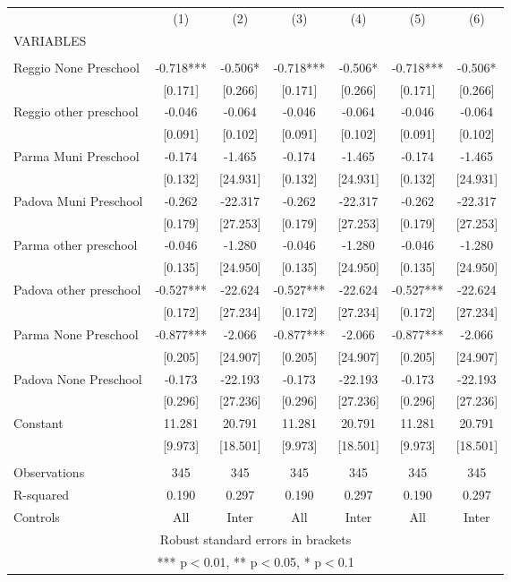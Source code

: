 \begin{tabular}{lcccccc} \hline
 & (1) & (2) & (3) & (4) & (5) & (6) \\
VARIABLES &  &  &  &  &  &  \\ \hline
 &  &  &  &  &  &  \\
Reggio None Preschool & -0.718*** & -0.506* & -0.718*** & -0.506* & -0.718*** & -0.506* \\
 & [0.171] & [0.266] & [0.171] & [0.266] & [0.171] & [0.266] \\
Reggio other preschool & -0.046 & -0.064 & -0.046 & -0.064 & -0.046 & -0.064 \\
 & [0.091] & [0.102] & [0.091] & [0.102] & [0.091] & [0.102] \\
Parma Muni Preschool & -0.174 & -1.465 & -0.174 & -1.465 & -0.174 & -1.465 \\
 & [0.132] & [24.931] & [0.132] & [24.931] & [0.132] & [24.931] \\
Padova Muni Preschool & -0.262 & -22.317 & -0.262 & -22.317 & -0.262 & -22.317 \\
 & [0.179] & [27.253] & [0.179] & [27.253] & [0.179] & [27.253] \\
Parma other preschool & -0.046 & -1.280 & -0.046 & -1.280 & -0.046 & -1.280 \\
 & [0.135] & [24.950] & [0.135] & [24.950] & [0.135] & [24.950] \\
Padova other preschool & -0.527*** & -22.624 & -0.527*** & -22.624 & -0.527*** & -22.624 \\
 & [0.172] & [27.234] & [0.172] & [27.234] & [0.172] & [27.234] \\
Parma None Preschool & -0.877*** & -2.066 & -0.877*** & -2.066 & -0.877*** & -2.066 \\
 & [0.205] & [24.907] & [0.205] & [24.907] & [0.205] & [24.907] \\
Padova None Preschool & -0.173 & -22.193 & -0.173 & -22.193 & -0.173 & -22.193 \\
 & [0.296] & [27.236] & [0.296] & [27.236] & [0.296] & [27.236] \\
Constant & 11.281 & 20.791 & 11.281 & 20.791 & 11.281 & 20.791 \\
 & [9.973] & [18.501] & [9.973] & [18.501] & [9.973] & [18.501] \\
 &  &  &  &  &  &  \\
Observations & 345 & 345 & 345 & 345 & 345 & 345 \\
R-squared & 0.190 & 0.297 & 0.190 & 0.297 & 0.190 & 0.297 \\
 Controls & All & Inter & All & Inter & All & Inter \\ \hline
\multicolumn{7}{c}{ Robust standard errors in brackets} \\
\multicolumn{7}{c}{ *** p$<$0.01, ** p$<$0.05, * p$<$0.1} \\
\end{tabular}
